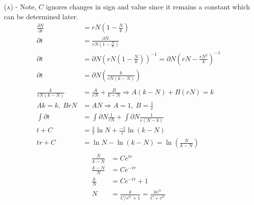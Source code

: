 \documentclass[11pt,answers]{exam}
\begin{document}
\begin{questions}
\begin{solution}
\newline\textsc{(a)} - Note, $C$ ignores changes in sign and value since it remains a constant which can be determined later.
\begin{align*}
\frac{\partial{N}}{\partial{t}} &= rN\left(1 - \frac{N}{k}\right) \\
\partial{t} &= \frac{\partial{N}}{rN\left(1 - \frac{N}{k}\right)} \\
\partial{t} &= \partial{N}\left( rN\left(1 - \frac{N}{k}\right) \right)^{-1} = \partial{N}\left(rN - \frac{rN^2}{k}\right)^{-1} \\
\partial{t} &= \partial{N}\left( \frac{k}{rN(k-N)} \right) \\
\\
\frac{k}{rN(k-N)} &= \frac{A}{rN} + \frac{B}{k-N} \Rightarrow A(k-N) + B(rN) = k \\
Ak = k, ~ BrN &= AN \Rightarrow A = 1, ~ B = \frac{1}{r} \\
\int\partial{t} &= \int\partial{N}\frac{1}{rN} + \int\partial{N}\frac{1}{r(N-k)}\\
t + C &= \frac{1}{r}\ln{N} + \frac{-1}{r}\ln(k-N) \\
tr + C &= \ln{N} - \ln(k-N) = \ln{\left( \frac{N}{k-N} \right)} \\
\end{align*}
\begin{align*}
\frac{N}{k-N} &= Ce^{tr} \\
\frac{k-N}{N} &= Ce^{-tr} \\
\frac{k}{N} &= Ce^{-tr} + 1 \\
N &= \frac{k}{C/e^{tr} + 1} = \frac{ke^{tr}}{C + e^{tr}} \\
\end{align*}

\vspace{1em}


\end{solution}
\end{questions}
\end{document}
